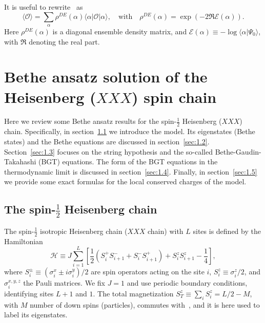 \documentclass[11pt]{iopart}
\begin{document}
It is useful to rewrite~ as 
%
\begin{equation}
\label{qa-prob}
\langle{\mathcal O}\rangle=\sum\limits_{\alpha}\rho^{DE}(\alpha)
\langle\alpha|{\mathcal O}|\alpha\rangle,\quad\textrm{with}\quad 
\rho^{DE}(\alpha)=\exp(-2\Re{\mathcal E}(\alpha)).
\end{equation}
%
Here $\rho^{DE}(\alpha)$ is a diagonal ensemble density matrix, and ${\mathcal E}(\alpha)
\equiv-\log\langle\alpha|\Psi_0\rangle$, with $\Re$ denoting the real part. 

\section{Bethe ansatz solution of the Heisenberg ($XXX$) spin chain}
\label{sec:1}

Here we review some Bethe ansatz results for the spin-$\frac{1}{2}$ Heisenberg 
($XXX$) chain. Specifically, in section~\ref{sec:1.1} we introduce the model. 
Its eigenstates (Bethe states) and the Bethe equations are discussed in 
section~\ref{sec:1.2}. Section~\ref{sec:1.3} focuses on the string hypothesis 
and the so-called Bethe-Gaudin-Takahashi (BGT) equations. The form of the 
BGT equations in the thermodynamic limit is discussed in section~\ref{sec:1.4}. 
Finally, in section~\ref{sec:1.5} we provide some exact formulas for the 
local conserved charges of the model. 


\subsection{The spin-$\frac{1}{2}$ Heisenberg chain}
\label{sec:1.1}

The spin-$\frac{1}{2}$ isotropic Heisenberg chain ($XXX$ chain) with $L$ sites 
is defined by the Hamiltonian 
%
\begin{equation}
\label{xxx-ham}
{\mathcal H}\equiv J\sum\limits_{i=1}^L\left[\frac{1}{2}(S_i^+S^-_{i+1} 
+S_i^{-}S_{i+1}^+)+S_i^zS_{i+1}^z-\frac{1}{4}\right],  
\end{equation}
%
where $S^{\pm}_i\equiv (\sigma_i^x\pm i\sigma_i^y)/2$ are spin operators acting on the 
site $i$, $S_i^z\equiv\sigma_i^z/2$, and $\sigma^{x,y,z}_i$ the Pauli matrices. We fix 
$J=1$ and use periodic boundary conditions, identifying sites $L+1$ and $1$. The total 
magnetization $S_{T}^z\equiv\sum_iS_i^z=L/2-M$, with $M$ number of down spins (particles), 
commutes with~, and it is here used to label its eigenstates. 
\end{document}
